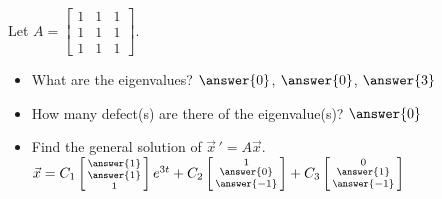 \documentclass{ximera}
\begin{document}
\begin{exercise}%
    Let $A =
    \left[ 
        \begin{smallmatrix}
            1 & 1 & 1 \\
            1 & 1 & 1 \\
            1 & 1 & 1 
        \end{smallmatrix}
    \right]$.  
    \begin{itemize}
        \item What are the eigenvalues? $\answer{0}$, $\answer{0}$, $\answer{3}$
        \item How many defect(s) are there of the eigenvalue(s)? $\answer{0}$
        \item Find the general solution of $\vec{x}\,' = A\vec{x}$.\\
            $\vec{x} =
            C_1 \left[ \begin{smallmatrix}
                \answer{1} \\ \answer{1} \\ 1
            \end{smallmatrix}\right]
            e^{3t} + C_2
            \left[ \begin{smallmatrix}
                1 \\ \answer{0} \\ \answer{-1}
            \end{smallmatrix}\right] + C_3
            \left[ \begin{smallmatrix}
                0 \\ \answer{1} \\ \answer{-1}
            \end{smallmatrix}\right]$
    \end{itemize}
\end{exercise}
\end{document}

